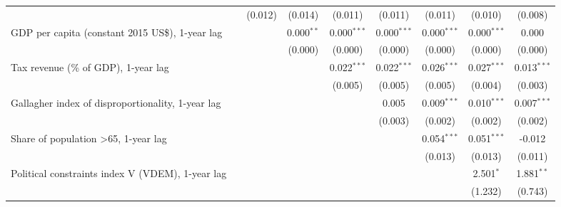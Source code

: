 \begin{table}[htbp]
\begin{tabular}{lcccccccc}
                                                                                &              & (0.012)        & (0.014)        & (0.011)        & (0.011)        & (0.011)        & (0.010)        & (0.008)\\   
      GDP per capita (constant 2015 US\$), 1-year lag                           &              &                & 0.000$^{**}$   & 0.000$^{***}$  & 0.000$^{***}$  & 0.000$^{***}$  & 0.000$^{***}$  & 0.000\\   
                                                                                &              &                & (0.000)        & (0.000)        & (0.000)        & (0.000)        & (0.000)        & (0.000)\\   
      Tax revenue (\% of GDP), 1-year lag                                       &              &                &                & 0.022$^{***}$  & 0.022$^{***}$  & 0.026$^{***}$  & 0.027$^{***}$  & 0.013$^{***}$\\   
                                                                                &              &                &                & (0.005)        & (0.005)        & (0.005)        & (0.004)        & (0.003)\\   
      Gallagher index of disproportionality, 1-year lag                         &              &                &                &                & 0.005          & 0.009$^{***}$  & 0.010$^{***}$  & 0.007$^{***}$\\   
                                                                                &              &                &                &                & (0.003)        & (0.002)        & (0.002)        & (0.002)\\   
      Share of population >65, 1-year lag                                       &              &                &                &                &                & 0.054$^{***}$  & 0.051$^{***}$  & -0.012\\   
                                                                                &              &                &                &                &                & (0.013)        & (0.013)        & (0.011)\\   
      Political constraints index V (VDEM), 1-year lag                          &              &                &                &                &                &                & 2.501$^{*}$    & 1.881$^{**}$\\   
                                                                                &              &                &                &                &                &                & (1.232)        & (0.743)\\   

\end{tabular}
\end{table}

